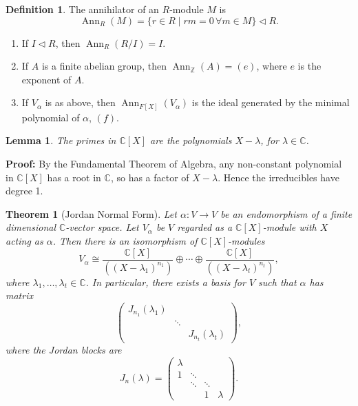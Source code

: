 \documentclass[12pt]{article}
\DeclareMathOperator{\Ann}{Ann}
\newtheorem{theorem}{Theorem}[section]
\newtheorem{lemma}{Lemma}[section]
\theoremstyle{definition}
\newtheorem{definition}{Definition}[section]
\theoremstyle{remark}
\begin{document}
\begin{definition}
	The annihilator of an $R$-module $M$ is
	\[
		\Ann_R(M) = \{r \in R \mid rm = 0 \, \forall m \in M \} \lhd R
	.\]
\end{definition}

\begin{enumerate}[label = (\roman*)]
	\item If $I \lhd R$, then $\Ann_{R}(R/I) = I$.
	\item If $A$ is a finite abelian group, then $\Ann_{\mathbb{Z}}(A) = (e)$, where $e$ is the exponent of $A$.
	\item If $V_{\alpha}$ is as above, then $\Ann_{F[X]}(V_{\alpha})$ is the ideal generated by the minimal polynomial of $\alpha$, $(f)$.
\end{enumerate}

\begin{lemma}
	The primes in $\mathbb{C}[X]$ are the polynomials $X - \lambda$, for $\lambda \in \mathbb{C}$.
\end{lemma}

\begin{adjustbox}{minipage = \columnwidth - 25.5pt, margin=1em, frame=1pt, margin=0em}
	\textbf{Proof:} By the Fundamental Theorem of Algebra, any non-constant polynomial in $\mathbb{C}[X]$ has a root in $\mathbb{C}$, so has a factor of $X - \lambda$. Hence the irreducibles have degree 1.
\end{adjustbox}

\begin{theorem}[Jordan Normal Form]
	Let $\alpha : V \to V$ be an endomorphism of a finite dimensional $\mathbb{C}$-vector space. Let $V_{\alpha}$ be $V$ regarded as a $\mathbb{C}[X]$-module with $X$ acting as $\alpha$. Then there is an isomorphism of $\mathbb{C}[X]$-modules
	\[
		V_{\alpha} \cong \frac{\mathbb{C}[X]}{((X-\lambda_1)^{n_1})} \oplus \cdots \oplus \frac{\mathbb{C}[X]}{((X - \lambda_t)^{n_t})}
	,\]
	where $\lambda_1, \ldots, \lambda_t \in \mathbb{C}$. In particular, there exists a basis for $V$ such that $\alpha$ has matrix
	\[
	\begin{pmatrix}
		J_{n_1}(\lambda_1) & & \\
				   & \ddots & \\
				   & & J_{n_t}(\lambda_t)
	\end{pmatrix}
	,\]
	where the Jordan blocks are
	\[
		J_n(\lambda) =
		\begin{pmatrix}
			\lambda & & & \\
			1 & \ddots & & \\
			  & \ddots & \ddots & \\
			  & & 1 & \lambda
		\end{pmatrix}
	.\]
\end{theorem}
\end{document}
